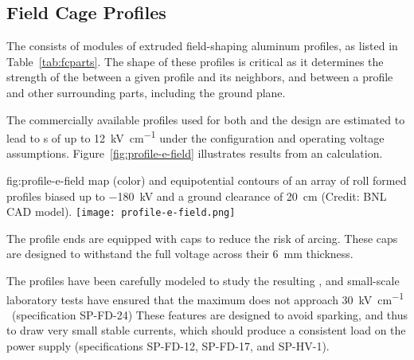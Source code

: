 \subsection{Field Cage Profiles}
\label{sec:fdsp-hv-des-fc-profiles}

The  consists of modules of extruded field-shaping aluminum %
profiles, as listed in Table~\ref{tab:fcparts}. The shape of these %
profiles is critical as it determines the strength of the \efield{} between a given profile and its neighbors, and between a profile and 
other surrounding parts, including the ground plane.

The commercially available profiles used for both  and the  design are estimated to lead to \efield{}s of up to \SI{12}{\kilo\volt\per\centi\meter} under the 
configuration and operating voltage assumptions.
Figure~\ref{fig:profile-e-field} illustrates results from an \efield{} calculation.

\begin{dunefigure}
{fig:profile-e-field}
{\efield map (color) and equipotential contours of an array of roll formed profiles biased up to \SI{-180}{\kV} and a ground clearance of \SI{20}{\cm} (Credit: BNL CAD model).} \texttt{[image: profile-e-field.png]}
\end{dunefigure}

The profile ends are equipped with  caps to reduce the risk of arcing.  These caps are designed %
to withstand the full voltage across their \SI{6}{\milli\m} thickness. 

The profiles have been carefully modeled to study the resulting \efield{}, 
and small-scale laboratory tests have %
ensured that the maximum \efield{} does not approach \SI{30}{\kV\per\cm}
~\cite{Blatter:2014wua}(specification SP-FD-24)
These features are designed to avoid sparking, and thus to draw very small stable currents, 
which should produce a consistent load on the power supply (specifications SP-FD-12, SP-FD-17, and SP-HV-1).


